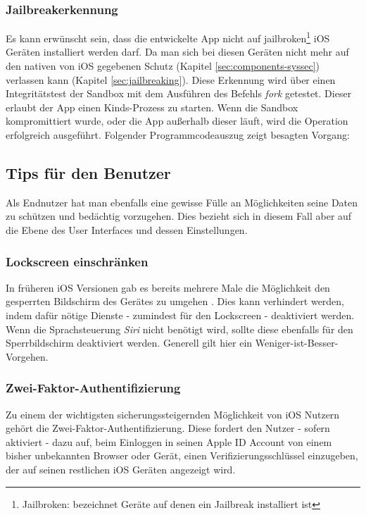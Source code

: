 		\subsubsection{Jailbreakerkennung}
			Es kann erwünscht sein, dass die entwickelte App nicht auf
			jailbroken\footnote{Jailbroken: bezeichnet Geräte auf denen ein Jailbreak
			installiert ist} iOS Geräten installiert werden darf.
			Da man sich bei diesen Geräten nicht mehr auf den nativen von iOS gegebenen Schutz (Kapitel
			\ref{sec:components-syssec}) verlassen kann (Kapitel \ref{sec:jailbreaking}).
			Diese Erkennung wird über einen Integritätstest der Sandbox mit dem
			Ausführen des Befehls \textsl{fork} getestet\cite[S.328]{Zdziarski2012}.
			Dieser erlaubt der App einen Kinds-Prozess zu starten. Wenn die Sandbox
			kompromittiert wurde, oder die App außerhalb dieser läuft, wird die
			Operation erfolgreich ausgeführt. Folgender Programmcodeauszug zeigt
			besagten Vorgang:
			
	\subsection{Tips für den Benutzer}
		Als Endnutzer hat man ebenfalls eine gewisse Fülle an Möglichkeiten seine
		Daten zu schützen und bedächtig vorzugehen. Dies bezieht sich in diesem Fall
		aber auf die Ebene des User Interfaces und dessen Einstellungen.
		\subsubsection{Lockscreen einschränken}
			In früheren iOS Versionen gab es bereits mehrere Male die Möglichkeit den
			gesperrten Bildschirm des Gerätes zu umgehen
			\cite{IOS7LockscreenBypass2013}.
			Dies kann verhindert werden, indem dafür nötige Dienste - zumindest für den
			Lockscreen - deaktiviert werden. Wenn die Sprachsteuerung \textsl{Siri} nicht benötigt
			wird, sollte diese ebenfalls für den Sperrbildschirm deaktiviert werden.
			Generell gilt hier ein Weniger-ist-Besser-Vorgehen.
		\subsubsection{Zwei-Faktor-Authentifizierung }
			Zu einem der wichtigsten sicherungssteigernden Möglichkeit von iOS Nutzern
			gehört die Zwei-Faktor-Authentifizierung. Diese fordert den Nutzer - sofern
			aktiviert - dazu auf, beim Einloggen in seinen Apple ID Account von einem
			bisher unbekannten Browser oder Gerät, einen Verifizierungsschlüssel
			einzugeben, der auf seinen restlichen iOS Geräten angezeigt
			wird\cite{AppleiOS9Preview2015}.
